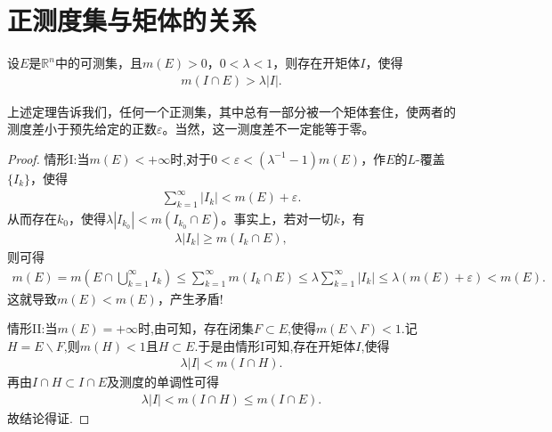 \documentclass[../../main.tex]{subfiles}%
\begin{document}
\section{正测度集与矩体的关系}

\begin{theorem}\label{theorem:定理2.19}
设\(E\)是\(\mathbb{R}^n\)中的可测集，且\(m(E)>0\)，\(0 < \lambda < 1\)，则存在开矩体\(I\)，使得
\begin{align}
m(I\cap E)>\lambda|I|.\label{eq::::--FSAFF-2.8}
\end{align}
\end{theorem}
\begin{remark}
上述定理告诉我们，任何一个正测集，其中总有一部分被一个矩体套住，使两者的测度差小于预先给定的正数\(\varepsilon\)。当然，这一测度差不一定能等于零。 
\end{remark}
\begin{proof}

{\heiti 情形I:}当\(m(E)<+\infty\)时,对于\(0 < \varepsilon < (\lambda^{-1}-1)m(E)\)，作\(E\)的\(L\)-覆盖\(\{I_k\}\)，使得
\begin{align*}
\sum_{k = 1}^{\infty}|I_k|<m(E)+\varepsilon.
\end{align*}
从而存在\(k_0\)，使得\(\lambda|I_{k_0}|<m(I_{k_0}\cap E)\)。事实上，若对一切\(k\)，有
\begin{align*}
\lambda|I_k|\geqslant m(I_k\cap E),
\end{align*}
则可得
\begin{align*}
m(E)=m(E\cap \bigcup_{k=1}^{\infty}I_k)\leqslant\sum_{k = 1}^{\infty}m(I_k\cap E)\leqslant\lambda\sum_{k = 1}^{\infty}|I_k|\leqslant\lambda(m(E)+\varepsilon)<m(E).
\end{align*}
这就导致\(m(E)<m(E)\)，产生矛盾!

{\heiti 情形II:}当$m(E)=+\infty$时,由可知，存在闭集$F\subset E$,使得$m(E\backslash F)<1$.记$H=E\backslash F$,则$m(H)<1$且$H\subset E$.于是由{\heiti 情形I}可知,存在开矩体$I$,使得
\begin{align*}
\lambda |I|<m(I\cap H).
\end{align*}
再由$I\cap H\subset I\cap E$及测度的单调性可得
\begin{align*}
\lambda |I|<m(I\cap H)\leqslant m(I\cap E).
\end{align*}
故结论得证.

\end{proof}
\end{document}
